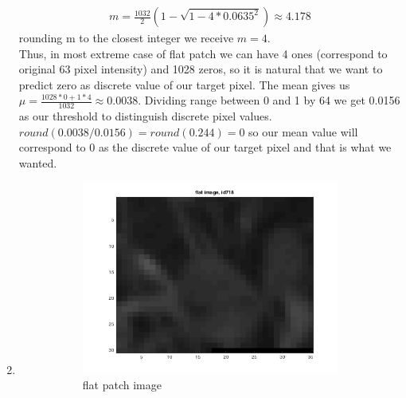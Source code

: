 \documentclass{article}
\begin{document}
\begin{enumerate}[label=(\alph*)]
					\begin{gather*}
						m = \frac{1032}{2}(1 - \sqrt{1 - 4 * 0.0635^2}) \approx 4.178
					\end{gather*}
					rounding m to the closest integer we receive $m = 4$. \\Thus, in most extreme case of flat patch we can have 4 ones (correspond to original 63 pixel intensity) and 1028 zeros, so it is natural that we want to predict zero as discrete value of our target pixel.  The mean gives us $\mu = \frac{1028 * 0 + 1 * 4} {1032} \approx 0.0038$. Dividing range between 0 and 1 by 64 we get 0.0156 as our threshold to distinguish discrete pixel values. $round(0.0038/0.0156)=round(0.244)=0$ so our mean value will correspond to 0 as the discrete value of our target pixel and that is what we wanted.
				\item
				 	\begin{figure}[t]
				 		\centering
				 		\caption{patch images}
				 		\label{fig:patch_images}
						\begin{subfigure}{0.5\textwidth}
											      	\includegraphics[width=\linewidth]{images/p1-1-c_flat}
											      	\caption{flat patch image}
											      	\label{fig:flat_patch_image}
						\end{subfigure}%
						\begin{subfigure}{0.5\textwidth}

\end{subfigure}
\end{figure}
\end{enumerate}
\end{document}
